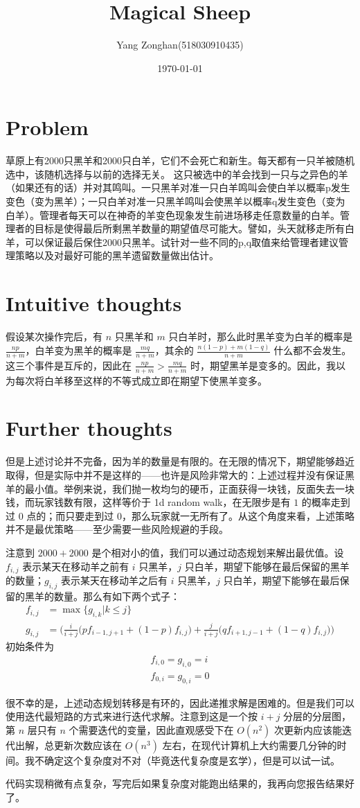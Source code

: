 \documentclass[11pt,a4paper,oneside]{article}
\begin{document}
\title{\textbf{Magical Sheep}}
\author{Yang Zonghan(518030910435)}
\date{\today}
\maketitle
\setlength{\parindent}{2em}
\section{Problem}
草原上有2000只黑羊和2000只白羊，它们不会死亡和新生。每天都有一只羊被随机选中，该随机选择与以前的选择无关。 这只被选中的羊会找到一只与之异色的羊（如果还有的话）并对其鸣叫。一只黑羊对准一只白羊鸣叫会使白羊以概率p发生变色（变为黑羊）；一只白羊对准一只黑羊鸣叫会使黑羊以概率q发生变色（变为白羊）。管理者每天可以在神奇的羊变色现象发生前进场移走任意数量的白羊。管理者的目标是使得最后所剩黑羊数量的期望值尽可能大。譬如，头天就移走所有白羊，可以保证最后保住2000只黑羊。试针对一些不同的p,q取值来给管理者建议管理策略以及对最好可能的黑羊遗留数量做出估计。 

\section{Intuitive thoughts}
假设某次操作完后，有 $n$ 只黑羊和 $m$ 只白羊时，那么此时黑羊变为白羊的概率是 $\frac {np} {n+m}$，白羊变为黑羊的概率是 $\frac {mq} {n+m}$，其余的 $\frac {n(1 - p) + m(1 - q)} {n+m}$ 什么都不会发生。这三个事件是互斥的，因此在 $\frac {np} {n+m} > \frac {mq} {n+m}$ 时，期望黑羊是变多的。因此，我以为每次将白羊移至这样的不等式成立即在期望下使黑羊变多。

\section{Further thoughts}
但是上述讨论并不完备，因为羊的数量是有限的。在无限的情况下，期望能够趋近取得，但是实际中并不是这样的——也许是风险非常大的：上述过程并没有保证黑羊的最小值。举例来说，我们抛一枚均匀的硬币，正面获得一块钱，反面失去一块钱，而玩家钱数有限，这样等价于 1d random walk，在无限步是有 $1$ 的概率走到过 $0$ 点的；而只要走到过 $0$，那么玩家就一无所有了。从这个角度来看，上述策略并不是最优策略——至少需要一些风险规避的手段。

注意到 $2000+2000$ 是个相对小的值，我们可以通过动态规划来解出最优值。设 $f_{i,j}$ 表示某天在移动羊之前有 $i$ 只黑羊，$j$ 只白羊，期望下能够在最后保留的黑羊的数量；$g_{i,j}$ 表示某天在移动羊之后有 $i$ 只黑羊，$j$ 只白羊，期望下能够在最后保留的黑羊的数量。那么有如下两个式子：
\begin{align}
f_{i,j} &= \max \{g_{i,k} | k \leq j\} \\
g_{i,j} &= \Big ( \frac i {i + j} \big(p f_{i - 1, j + 1} + (1 - p) f_{i, j}\big) + \frac j {i + j} \big(q f_{i + 1, j - 1} + (1 - q) f_{i, j}\big) \Big ) 
\end{align}
初始条件为 \begin{align}
f_{i,0} = g_{i,0} = i \\
f_{0,i} = g_{0,i} = 0 
\end{align}

很不幸的是，上述动态规划转移是有环的，因此递推求解是困难的。但是我们可以使用迭代最短路的方式来进行迭代求解。注意到这是一个按 $i+ j$ 分层的分层图，第 $n$ 层只有 $n$ 个需要迭代的变量，因此直观感受下在 $O(n ^ 2)$ 次更新内应该能迭代出解，总更新次数应该在 $O(n ^ 3)$ 左右，在现代计算机上大约需要几分钟的时间。我不确定这个复杂度对不对（毕竟迭代复杂度是玄学），但是可以试一试。

代码实现稍微有点复杂，写完后如果复杂度对能跑出结果的，我再向您报告结果好了。
\end{document}
